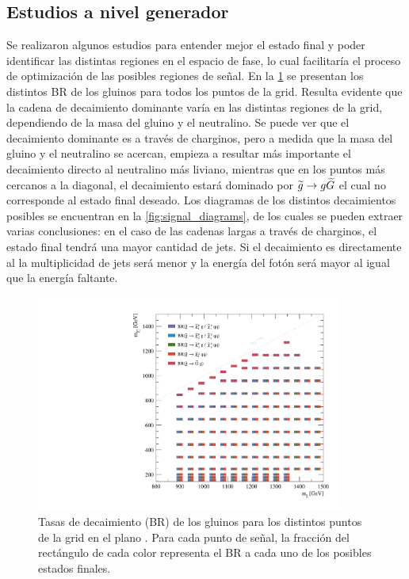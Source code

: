 \subsection{Estudios a nivel generador} %
\label{sec:susy_studies}

Se realizaron algunos estudios para entender mejor el estado final y poder
identificar las distintas regiones en el espacio de fase, lo cual facilitaría el
proceso de optimización de las posibles regiones de se\~nal. En la
\cref{fig:signal_br_gl} se presentan los distintos BR de los gluinos para todos
los puntos de la grid. Resulta evidente que la cadena de decaimiento dominante
varía en las distintas regiones de la grid, dependiendo de la masa del gluino y
el neutralino. Se puede ver que el decaimiento dominante es a través de
charginos, pero a medida que la masa del gluino y el neutralino se acercan,
empieza a resultar más importante el decaimiento directo al neutralino más
liviano, mientras que en los puntos más cercanos a la diagonal, el decaimiento
estará dominado por $\widetilde{g}\rightarrow g\widetilde{G}$ el cual no corresponde al estado
final deseado. Los diagramas de los distintos decaimientos posibles se encuentran
en la \cref{fig:signal_diagrams}, de los cuales se pueden extraer varias
conclusiones: en el caso de las cadenas largas a través de charginos, el estado
final tendrá una mayor cantidad de jets. Si el decaimiento es directamente al
{\ninoone} la multiplicidad de jets será menor y la energía del fotón será mayor
al igual que la energía faltante.


\begin{figure}[!htb]
  \centering

  \includegraphics[width=0.9\textwidth]{figures/br_gl_X}

  \caption{Tasas de decaimiento (BR) de los gluinos para los distintos puntos de la grid en
    el plano \mgmn. Para cada punto de señal, la fracción del rectángulo de cada color representa
    el BR a cada uno de los posibles estados finales.}
  \label{fig:signal_br_gl}
\end{figure}


